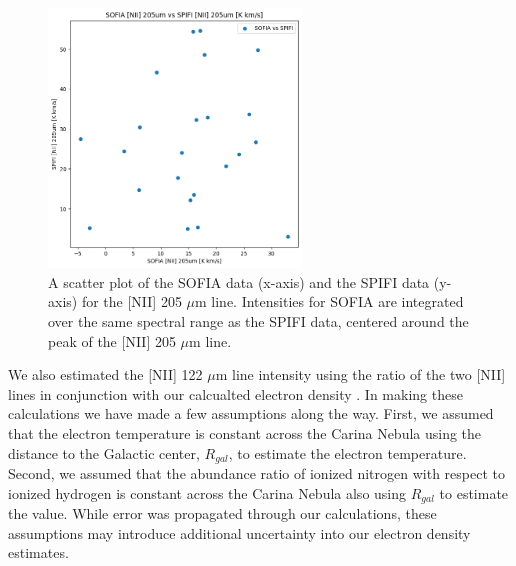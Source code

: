\begin{figure}
    \centering
    \includegraphics[width=0.6\textwidth]{figs/carina/oberst.png}
    \caption[Scatter Plot of SPIFI and SOFIA {[NII]} 205 $\mu$m Line Intensities]{
        A scatter plot of the SOFIA data (x-axis) and the SPIFI data (y-axis) for the [NII] 205 $\mu$m line.
        Intensities for SOFIA are integrated over the same spectral range as the SPIFI data, centered around the peak of the [NII] 205 $\mu$m line.
        }
    \label{carina/fig:oberst}
\end{figure}

We also estimated the [NII] 122 $\mu$m line intensity using the ratio of the two [NII] lines in conjunction with our calcualted electron density \parencite{goldsmith2015herschel}.
In making these calculations we have made a few assumptions along the way.
First, we assumed that the electron temperature is constant across the Carina Nebula using the distance to the Galactic center, $R_{gal}$, to estimate the electron temperature.
Second, we assumed that the abundance ratio of ionized nitrogen with respect to ionized hydrogen is constant across the Carina Nebula also using $R_{gal}$ to estimate the value.
While error was propagated through our calculations, these assumptions may introduce additional uncertainty into our electron density estimates. 


